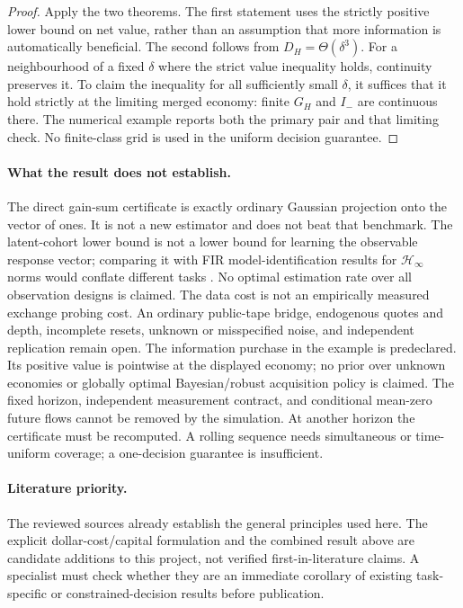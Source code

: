 \begin{proof}
Apply the two theorems. The first statement uses the strictly positive
lower bound on net value, rather than an assumption that more information
is automatically beneficial. The second follows from $D_H=\Theta(\delta^3)$.
For a neighbourhood of a fixed $\delta$ where the strict value inequality
holds, continuity preserves it. To claim the inequality for all sufficiently
small $\delta$, it suffices that it hold strictly at the limiting merged
economy: finite $G_H$ and $I_-$ are continuous there. The numerical example
reports both the primary pair and that limiting check. No finite-class grid
is used in the uniform decision guarantee.
\end{proof}

\paragraph{What the result does not establish.}
The direct gain-sum certificate is exactly ordinary Gaussian projection onto
the vector of ones. It is not a new estimator and does not beat that benchmark.
The latent-cohort lower bound is not a lower bound for learning the observable
response vector; comparing it with FIR model-identification results for
$\mathcal H_\infty$ norms would conflate different tasks \citep{fhc:tu}.
No optimal estimation rate over all observation designs is claimed.
The data cost is not an empirically measured exchange probing cost.
An ordinary public-tape bridge, endogenous quotes and depth, incomplete resets,
unknown or misspecified noise, and independent replication remain open.
The information purchase in the example is predeclared. Its positive value
is pointwise at the displayed economy; no prior over unknown economies or
globally optimal Bayesian/robust acquisition policy is claimed.
The fixed horizon, independent measurement contract, and conditional mean-zero
future flows cannot be removed by the simulation. At another horizon the
certificate must be recomputed. A rolling sequence needs simultaneous or
time-uniform coverage; a one-decision guarantee is insufficient.

\paragraph{Literature priority.}
The reviewed sources already establish the general principles used here.
The explicit dollar-cost/capital formulation and the combined result above
are candidate additions to this project, not verified first-in-literature
claims. A specialist must check whether they are an immediate corollary of
existing task-specific or constrained-decision results before publication.

